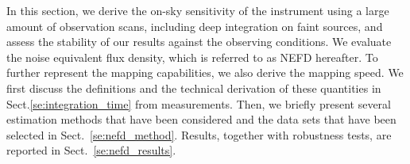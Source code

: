  
%

In this section, we derive the on-sky sensitivity of the instrument using a
large amount of observation scans, including deep integration on faint sources,
and assess the stability of our results against the observing
conditions.
We evaluate the noise equivalent flux density, which is referred to as
NEFD hereafter. To further represent the mapping capabilities, we also
derive the mapping speed.
We first discuss the definitions and the technical derivation of these quantities in
Sect.\ref{se:integration_time} from measurements. Then, we briefly present
several estimation methods that have been considered and the data sets that have
been selected in Sect.~\ref{se:nefd_method}. Results, together with robustness
tests, are reported in Sect.~\ref{se:nefd_results}.


